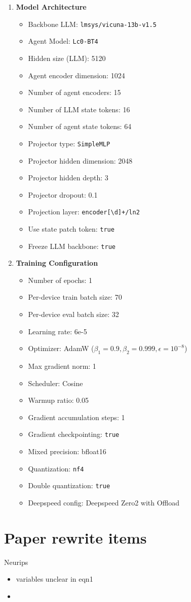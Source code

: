 \documentclass{article}
\theoremstyle{plain}
\theoremstyle{definition}
\theoremstyle{remark}
\begin{document}
\begin{enumerate}
  \item \textbf{Model Architecture}
  \begin{itemize}
    \item Backbone LLM: \texttt{lmsys/vicuna-13b-v1.5}
    \item Agent Model: \texttt{Lc0-BT4}
    \item Hidden size (LLM): 5120
    \item Agent encoder dimension: 1024
    \item Number of agent encoders: 15
    \item Number of LLM state tokens: 16
    \item Number of agent state tokens: 64
    \item Projector type: \texttt{SimpleMLP}
    \item Projector hidden dimension: 2048
    \item Projector hidden depth: 3
    \item Projector dropout: 0.1
    \item Projection layer: \texttt{encoder[\textbackslash d]+/ln2}
    \item Use state patch token: \texttt{true}
    \item Freeze LLM backbone: \texttt{true}
  \end{itemize}

  \item \textbf{Training Configuration}
  \begin{itemize}
    \item Number of epochs: 1
    \item Per-device train batch size: 70
    \item Per-device eval batch size: 32
    \item Learning rate: 6e-5
    \item Optimizer: AdamW (\(\beta_1 = 0.9, \beta_2 = 0.999, \epsilon = 10^{-8}\))
    \item Max gradient norm: 1
    \item Scheduler: Cosine
    \item Warmup ratio: 0.05
    \item Gradient accumulation steps: 1
    \item Gradient checkpointing: \texttt{true}
    \item Mixed precision: bfloat16 
    \item Quantization: \texttt{nf4}
    \item Double quantization: \texttt{true}
    \item Deepspeed config: Deepspeed Zero2 with Offload
  \end{itemize}

\end{enumerate}


\section{Paper rewrite items}
Neurips
\begin{itemize}
    \item variables unclear in eqn1
    \item 
    
    
\end{itemize}
\end{document}
